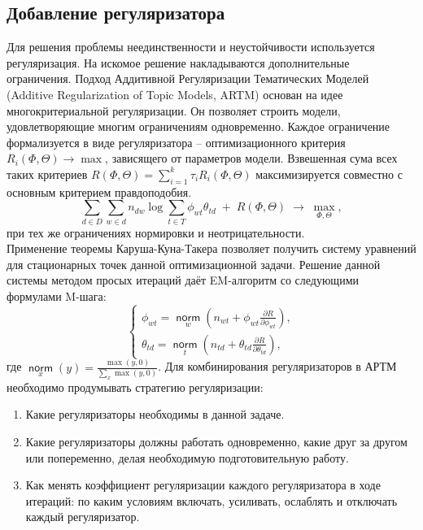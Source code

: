 \documentclass[12pt]{article}
\newcommand{\norm}{\mathop{\mathsf{norm}}\limits}
\begin{document}
	\subsection{Добавление регуляризатора}
Для решения проблемы неединственности и неустойчивости используется регуляризация. На искомое решение накладываются дополнительные ограничения. Подход Аддитивной Регуляризации Тематических Моделей  (Additive Regularization of Topic Models, ARTM) \cite{artmdef1, artmdef2, artmdef3} основан на идее многокритериальной регуляризации. Он позволяет строить модели, удовлетворяющие многим ограничениям одновременно. Каждое ограничение формализуется в виде регуляризатора -- оптимизационного критерия $R_i(\Phi,\Theta)\to\max$, зависящего от параметров модели. Взвешенная сума всех таких критериев $R(\Phi,\Theta) = \sum_{i=1}^k \tau_i R_i(\Phi,\Theta)$ максимизируется совместно с основным критерием правдоподобия.
\[
\sum_{d\in D} \sum_{w\in d} n_{dw}\log \sum_{t\in T} \phi_{wt}\theta_{td} \;+\; R(\Phi,\Theta)\;\to\; \max_{\Phi,\Theta},
\]
при тех же ограничениях нормировки и неотрицательности.\\
Применение теоремы Каруша-Куна-Такера позволяет получить систему уравнений для стационарных точек данной оптимизационной задачи. Решение данной системы методом просых итераций даёт EM-алгоритм со следующими формулами M-шага:
\[
\left\{
	\begin{aligned}
\phi_{wt} = \norm_w  \left(n_{wt} + \phi_{wt}\frac{\partial R}{\partial\phi_{wt}}\right),\\
\theta_{td} = \norm_t  \left(n_{td} + \theta_{td}\frac{\partial R}{\partial\theta_{td}}\right),
	\end{aligned}
\right.
\]
где $\norm_x(y) = \frac{\max(y, 0)}{\sum\limits_x \max(y, 0)}$.
Для комбинирования регуляризаторов в АРТМ необходимо продумывать стратегию регуляризации:
\begin{enumerate}
\item Какие регуляризаторы необходимы в данной задаче.
\item Какие регуляризаторы должны работать одновременно, какие друг за другом или попеременно, делая необходимую подготовительную работу.
\item Как менять коэффициент регуляризации каждого регуляризатора в ходе итераций: по каким условиям включать, усиливать, ослаблять и отключать каждый регуляризатор.
\end{enumerate}
\end{document}
